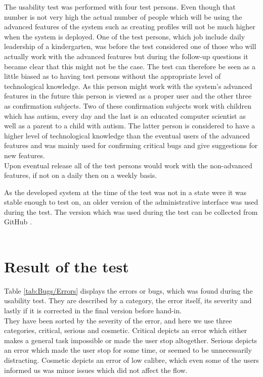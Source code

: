 The usability test was performed with four test persons. Even though that number is not very high the actual number of people which will be using the advanced features of the system such as creating profiles will not be much higher when the system is deployed. One of the test persons, which job include daily leadership of a kindergarten, was before the test considered one of those who will actually work with the advanced features but during the follow-up questions it became clear that this might not be the case. The test can therefore be seen as a little biased as to having test persons without the appropriate level of technological knowledge. As this person might work with the system's advanced features in the future this person is viewed as a proper user and the other three as confirmation subjects. Two of these confirmation subjects work with children which has autism, every day and the last is an educated computer scientist as well as a parent to a child with autism. The latter person is considered to have a higher level of technological knowledge than the eventual users of the advanced features and was mainly used for confirming critical bugs and give suggestions for new features.\\
Upon eventual release all of the test persons would work with the non-advanced features, if not on a daily then on a weekly basis.

As the developed system at the time of the test was not in a state were it was stable enough to test on, an older version of the administrative interface was used during the test. The version which was used during the test can be collected from GitHub \citep{testBranch}.\\
\\
\section{Result of the test}
Table \ref{tab:Bugs/Errors} displays the errors or bugs, which was found during the usability test. They are described by a category, the error itself, its severity and lastly if it is corrected in the final version before hand-in.\\
They have been sorted by the severity of the error, and here we use three categories, critical, serious and cosmetic. Critical depicts an error which either makes a general task impossible or made the user stop altogether. Serious depicts an error which made the user stop for some time, or seemed to be unnecessarily distracting. Cosmetic depicts an error of low calibre, which even some of the users informed us was minor issues which did not affect the flow.\\
\\

